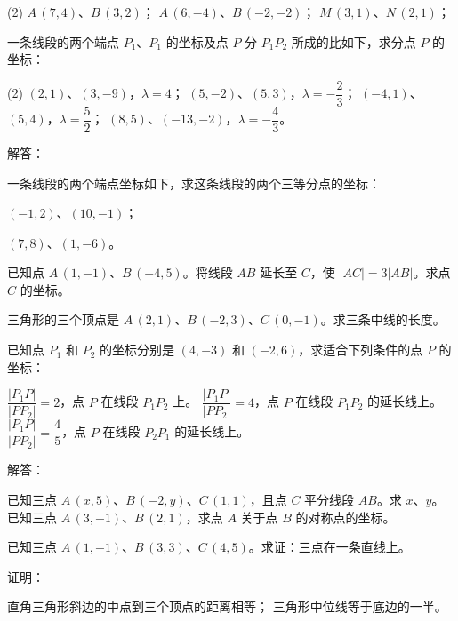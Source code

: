 \begin{Exercise}
\begin{question}
    \begin{tasks}(2)
      \task $A\,(7,4)$、$B\,(3,2)$；
      \task $A\,(6,-4)$、$B\,(-2,-2)$；
      \task $M\,(3,1)$、$N\,(2,1)$；
    \end{tasks}
    \item 一条线段的两个端点 $P_1$、$P_1$ 的坐标及点 $P$ 分 $\overline{P_1P_2}$ 所成的比如下，求分点 $P$ 的坐标：
    \begin{tasks}(2)
      \task $(2,1)$、$(3,-9)$，$\lambda=4$；
      \task $(5,-2)$、$(5,3)$，$\lambda=-\dfrac{2}{3}$；
      \task $(-4,1)$、$(5,4)$，$\lambda=\dfrac{5}{2}$；
      \task $(8,5)$、$(-13,-2)$，$\lambda=-\dfrac{4}{3}$。
    \end{tasks}
    \item 解答：
    \begin{tasks}
      \task 一条线段的两个端点坐标如下，求这条线段的两个三等分点的坐标：
      \begin{enumerate*}[i)]
        \item $(-1,2)$、$(10,-1)$；
        \item $(7,8)$、$(1,-6)$。
      \end{enumerate*}
      \task 已知点 $A\,(1,-1)$、$B\,(-4,5)$。将线段 $AB$ 延长至 $C$，使 $|AC|=3|AB|$。求点 $C$ 的坐标。
    \end{tasks}
    \item 三角形的三个顶点是 $A\,(2,1)$、$B\,(-2,3)$、$C\,(0,-1)$。求三条中线的长度。
    \item 已知点 $P_1$ 和 $P_2$ 的坐标分别是 $(4,-3)$ 和 $(-2,6)$，求适合下列条件的点 $P$ 的坐标：
    \begin{tasks}
      \task $\dfrac{|P_1P|}{|PP_2|}=2$，点 $P$ 在线段 $P_1P_2$ 上。
      \task $\dfrac{|P_1P|}{|PP_2|}=4$，点 $P$ 在线段 $P_1P_2$ 的延长线上。
      \task $\dfrac{|P_1P|}{|PP_2|}=\dfrac{4}{5}$，点 $P$ 在线段 $P_2P_1$ 的延长线上。
    \end{tasks}
    \item 解答：
    \begin{tasks}
      \task 已知三点 $A\,(x,5)$、$B\,(-2,y)$、$C\,(1,1)$，且点 $C$ 平分线段 $AB$。求 $x$、$y$。
      \task 已知三点 $A\,(3,-1)$、$B\,(2,1)$，求点 $A$ 关于点 $B$ 的对称点的坐标。
    \end{tasks}
    \item 已知三点 $A\,(1,-1)$、$B\,(3,3)$、$C\,(4,5)$。求证：三点在一条直线上。
    \item 证明：
    \begin{tasks}
      \task 直角三角形斜边的中点到三个顶点的距离相等；
      \task 三角形中位线等于底边的一半。
    \end{tasks}
  \end{question}
\end{Exercise}

